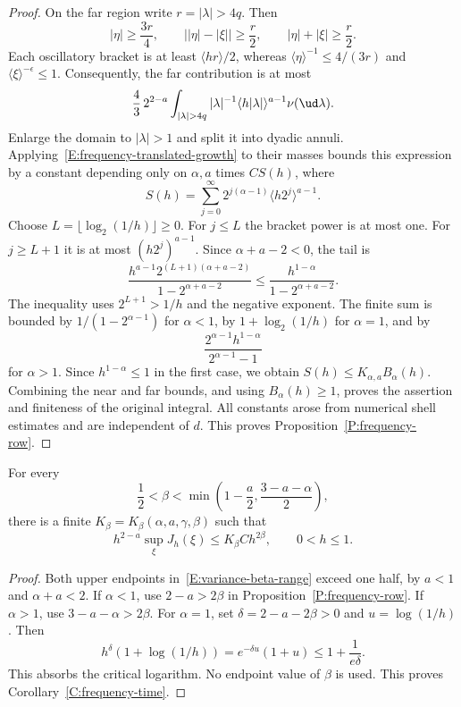 \begin{proof}
  On the far region write $r = |\lambda| > 4q$. Then
  \[
    |\eta| \ge \frac{3r}4,\qquad
    \big||\eta|-|\xi|\big| \ge \frac r2,\qquad
    |\eta|+|\xi| \ge \frac r2.
  \]
  Each oscillatory bracket is at least $\langle hr\rangle/2$, whereas
  $\langle\eta\rangle^{-1} \le 4/(3r)$ and
  $\langle\xi\rangle^{-\epsilon} \le 1$. Consequently, the far
  contribution is at most
  \[
    \frac43\,2^{2-a}\int_{|\lambda|>4q}
    |\lambda|^{-1}\langle h|\lambda|\rangle^{a-1}\nu(\ud\lambda).
  \]
  Enlarge the domain to $|\lambda| > 1$ and split it into dyadic annuli.
  Applying~\eqref{E:frequency-translated-growth} to their masses bounds
  this expression by a constant depending only on $\alpha,a$ times
  $C S(h)$, where
  \[
    S(h) = \sum_{j=0}^\infty
    2^{j(\alpha-1)}\langle h2^j\rangle^{a-1}.
  \]
  Choose $L = \lfloor\log_2(1/h)\rfloor \ge 0$. For $j \le L$ the
  bracket power is at most one. For $j \ge L+1$ it is at most
  $(h2^j)^{a-1}$. Since $\alpha+a-2 < 0$, the tail is
  \[
    \frac{h^{a-1}2^{(L+1)(\alpha+a-2)}}{1-2^{\alpha+a-2}}
    \le \frac{h^{1-\alpha}}{1-2^{\alpha+a-2}}.
  \]
  The inequality uses $2^{L+1} > 1/h$ and the negative exponent.
  The finite sum is bounded by $1/(1-2^{\alpha-1})$ for $\alpha < 1$,
  by $1+\log_2(1/h)$ for $\alpha = 1$, and by
  \[
    \frac{2^{\alpha-1}h^{1-\alpha}}{2^{\alpha-1}-1}
  \]
  for $\alpha > 1$. Since $h^{1-\alpha} \le 1$ in the first case,
  we obtain $S(h) \le K_{\alpha,a}B_\alpha(h)$. Combining the near and
  far bounds, and using $B_\alpha(h) \ge 1$, proves the assertion and
  finiteness of the original integral. All constants arose from numerical
  shell estimates and are independent of $d$.
  This proves Proposition~\ref{P:frequency-row}.
\end{proof}

\begin{corollary}\label{C:frequency-time}
  For every
  \begin{equation}\label{E:variance-beta-range}
    \frac12 < \beta < \min\left(1-\frac a2,
    \frac{3-a-\alpha}{2}\right),
  \end{equation}
  there is a finite $K_\beta = K_\beta(\alpha,a,\gamma,\beta)$ such that
  \begin{equation}\label{E:frequency-time-bound}
    h^{2-a}\sup_\xi J_h(\xi) \le K_\beta C h^{2\beta},
    \qquad 0 < h \le 1.
  \end{equation}
\end{corollary}

\begin{proof}
  Both upper endpoints in~\eqref{E:variance-beta-range} exceed one half,
  by $a < 1$ and $\alpha+a < 2$. If $\alpha < 1$, use
  $2-a > 2\beta$ in Proposition~\ref{P:frequency-row}. If $\alpha > 1$,
  use $3-a-\alpha > 2\beta$. For $\alpha = 1$, set
  $\delta = 2-a-2\beta > 0$ and $u = \log(1/h)$. Then
  \[
    h^\delta(1+\log(1/h))
    = e^{-\delta u}(1+u) \le 1+\frac1{e\delta}.
  \]
  This absorbs the critical logarithm. No endpoint value of $\beta$ is used.
  This proves Corollary~\ref{C:frequency-time}.
\end{proof}

